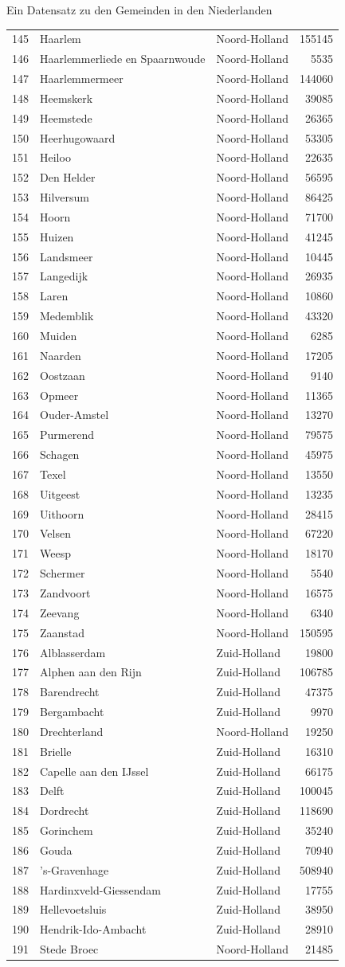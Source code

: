 \documentclass[ignorenonframetext,]{beamer}
\begin{document}
\begin{frame}[fragile]{Ein Datensatz zu den Gemeinden in den
Niederlanden}
\begin{longtable}[]{@{}lllr@{}}
145 & Haarlem & Noord-Holland & 155145\tabularnewline
146 & Haarlemmerliede en Spaarnwoude & Noord-Holland &
5535\tabularnewline
147 & Haarlemmermeer & Noord-Holland & 144060\tabularnewline
148 & Heemskerk & Noord-Holland & 39085\tabularnewline
149 & Heemstede & Noord-Holland & 26365\tabularnewline
150 & Heerhugowaard & Noord-Holland & 53305\tabularnewline
151 & Heiloo & Noord-Holland & 22635\tabularnewline
152 & Den Helder & Noord-Holland & 56595\tabularnewline
153 & Hilversum & Noord-Holland & 86425\tabularnewline
154 & Hoorn & Noord-Holland & 71700\tabularnewline
155 & Huizen & Noord-Holland & 41245\tabularnewline
156 & Landsmeer & Noord-Holland & 10445\tabularnewline
157 & Langedijk & Noord-Holland & 26935\tabularnewline
158 & Laren & Noord-Holland & 10860\tabularnewline
159 & Medemblik & Noord-Holland & 43320\tabularnewline
160 & Muiden & Noord-Holland & 6285\tabularnewline
161 & Naarden & Noord-Holland & 17205\tabularnewline
162 & Oostzaan & Noord-Holland & 9140\tabularnewline
163 & Opmeer & Noord-Holland & 11365\tabularnewline
164 & Ouder-Amstel & Noord-Holland & 13270\tabularnewline
165 & Purmerend & Noord-Holland & 79575\tabularnewline
166 & Schagen & Noord-Holland & 45975\tabularnewline
167 & Texel & Noord-Holland & 13550\tabularnewline
168 & Uitgeest & Noord-Holland & 13235\tabularnewline
169 & Uithoorn & Noord-Holland & 28415\tabularnewline
170 & Velsen & Noord-Holland & 67220\tabularnewline
171 & Weesp & Noord-Holland & 18170\tabularnewline
172 & Schermer & Noord-Holland & 5540\tabularnewline
173 & Zandvoort & Noord-Holland & 16575\tabularnewline
174 & Zeevang & Noord-Holland & 6340\tabularnewline
175 & Zaanstad & Noord-Holland & 150595\tabularnewline
176 & Alblasserdam & Zuid-Holland & 19800\tabularnewline
177 & Alphen aan den Rijn & Zuid-Holland & 106785\tabularnewline
178 & Barendrecht & Zuid-Holland & 47375\tabularnewline
179 & Bergambacht & Zuid-Holland & 9970\tabularnewline
180 & Drechterland & Noord-Holland & 19250\tabularnewline
181 & Brielle & Zuid-Holland & 16310\tabularnewline
182 & Capelle aan den IJssel & Zuid-Holland & 66175\tabularnewline
183 & Delft & Zuid-Holland & 100045\tabularnewline
184 & Dordrecht & Zuid-Holland & 118690\tabularnewline
185 & Gorinchem & Zuid-Holland & 35240\tabularnewline
186 & Gouda & Zuid-Holland & 70940\tabularnewline
187 & 's-Gravenhage & Zuid-Holland & 508940\tabularnewline
188 & Hardinxveld-Giessendam & Zuid-Holland & 17755\tabularnewline
189 & Hellevoetsluis & Zuid-Holland & 38950\tabularnewline
190 & Hendrik-Ido-Ambacht & Zuid-Holland & 28910\tabularnewline
191 & Stede Broec & Noord-Holland & 21485\tabularnewline

\end{longtable}
\end{frame}
\end{document}
